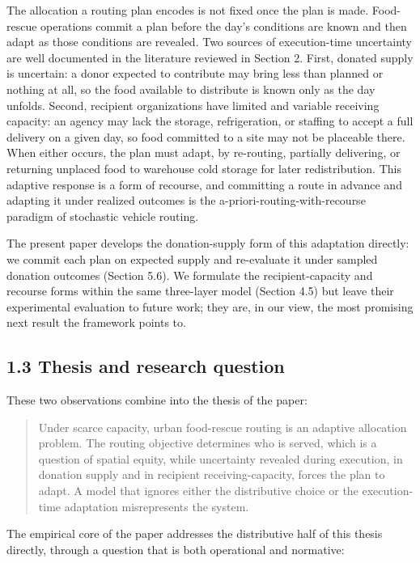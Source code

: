 \documentclass[
  11pt,
]{article}
\begin{document}
The allocation a routing plan encodes is not fixed once the plan is
made. Food-rescue operations commit a plan before the day's conditions
are known and then adapt as those conditions are revealed. Two sources
of execution-time uncertainty are well documented in the literature
reviewed in Section 2. First, donated supply is uncertain: a donor
expected to contribute may bring less than planned or nothing at all, so
the food available to distribute is known only as the day unfolds.
Second, recipient organizations have limited and variable receiving
capacity: an agency may lack the storage, refrigeration, or staffing to
accept a full delivery on a given day, so food committed to a site may
not be placeable there. When either occurs, the plan must adapt, by
re-routing, partially delivering, or returning unplaced food to
warehouse cold storage for later redistribution. This adaptive response
is a form of recourse, and committing a route in advance and adapting it
under realized outcomes is the a-priori-routing-with-recourse paradigm
of stochastic vehicle routing.

The present paper develops the donation-supply form of this adaptation
directly: we commit each plan on expected supply and re-evaluate it
under sampled donation outcomes (Section 5.6). We formulate the
recipient-capacity and recourse forms within the same three-layer model
(Section 4.5) but leave their experimental evaluation to future work;
they are, in our view, the most promising next result the framework
points to.

\subsection{1.3 Thesis and research
question}\label{thesis-and-research-question}

These two observations combine into the thesis of the paper:

\begin{quote}
Under scarce capacity, urban food-rescue routing is an adaptive
allocation problem. The routing objective determines who is served,
which is a question of spatial equity, while uncertainty revealed during
execution, in donation supply and in recipient receiving-capacity,
forces the plan to adapt. A model that ignores either the distributive
choice or the execution-time adaptation misrepresents the system.
\end{quote}

The empirical core of the paper addresses the distributive half of this
thesis directly, through a question that is both operational and
normative:
\end{document}
